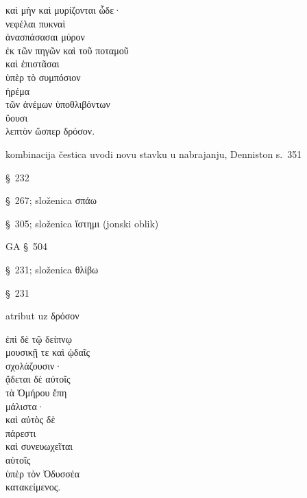 

{\large
\begin{greek}
\noindent καὶ μὴν καὶ μυρίζονται ὧδε· \\
νεφέλαι πυκναὶ \\
\tabto{2em} ἀνασπάσασαι μύρον \\
\tabto{4em} ἐκ τῶν πηγῶν καὶ τοῦ ποταμοῦ \\
\tabto{2em} καὶ ἐπιστᾶσαι \\
\tabto{4em} ὑπὲρ τὸ συμπόσιον \\
ἠρέμα \\
\tabto{2em} τῶν ἀνέμων ὑποθλιβόντων \\
ὕουσι \\
λεπτὸν ὥσπερ δρόσον.\\

\end{greek}
}

\begin{description}[noitemsep]
\item[καὶ μὴν καὶ] kombinacija čestica uvodi novu stavku u nabrajanju, Denniston s.~351
\item[μυρίζονται] §~232
\item[ἀνασπάσασαι] §~267; složenica σπάω
\item[ἐπιστᾶσαι] §~305; složenica ἵστημι (jonski oblik)
\item[τῶν ἀνέμων ὑποθλιβόντων] GA §~504
\item[ὑποθλιβόντων] §~231; složenica θλίβω
\item[ὕουσι] §~231
\item[λεπτὸν] atribut uz δρόσον
\end{description}




{\large
\begin{greek}
\noindent ἐπὶ δὲ τῷ δείπνῳ \\
\tabto{2em} μουσικῇ τε καὶ ᾠδαῖς \\
σχολάζουσιν· \\

\noindent ᾄδεται δὲ αὐτοῖς \\
τὰ Ὁμήρου ἔπη \\
\tabto{2em} μάλιστα· \\
καὶ αὐτὸς δὲ \\
πάρεστι \\
καὶ συνευωχεῖται \\
\tabto{2em} αὐτοῖς \\
\tabto{2em} ὑπὲρ τὸν Ὀδυσσέα \\
κατακείμενος. \\

\end{greek}
}

